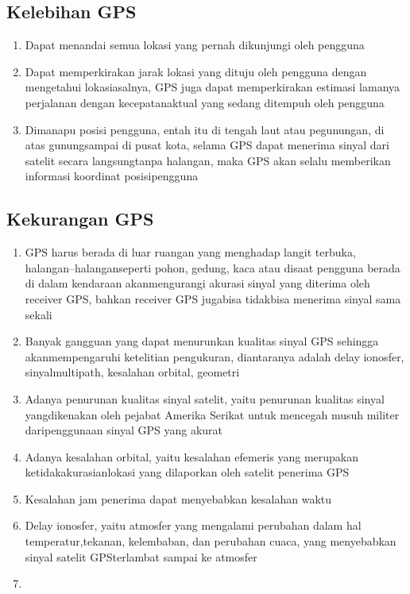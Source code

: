 \subsection{Kelebihan GPS}
\begin{enumerate}
	\item Dapat menandai semua lokasi yang pernah dikunjungi oleh pengguna
	\item Dapat memperkirakan jarak lokasi yang dituju oleh pengguna dengan mengetahui lokasiasalnya, GPS juga dapat memperkirakan estimasi lamanya perjalanan dengan kecepatanaktual yang sedang ditempuh oleh pengguna
	\item Dimanapu posisi pengguna, entah itu di tengah laut atau pegunungan, di atas gunungsampai di pusat kota, selama GPS dapat menerima sinyal dari satelit secara langsungtanpa halangan, maka GPS akan selalu memberikan informasi koordinat posisipengguna
\end{enumerate}

\subsection{Kekurangan GPS}
\begin{enumerate}
	\item GPS harus berada di luar ruangan yang menghadap langit terbuka, halangan–halanganseperti pohon, gedung, kaca atau disaat pengguna berada di dalam kendaraan akanmengurangi akurasi sinyal yang diterima oleh receiver GPS, bahkan receiver GPS jugabisa tidakbisa menerima sinyal sama sekali
	\item Banyak gangguan yang dapat menurunkan kualitas sinyal GPS sehingga akanmempengaruhi ketelitian pengukuran, diantaranya adalah delay ionosfer, sinyalmultipath, kesalahan orbital, geometri
	\item Adanya penurunan kualitas sinyal satelit, yaitu penurunan kualitas sinyal yangdikenakan oleh pejabat Amerika Serikat untuk mencegah musuh militer daripenggunaan sinyal GPS yang akurat
	\item Adanya kesalahan orbital, yaitu kesalahan efemeris yang merupakan ketidakakurasianlokasi yang dilaporkan oleh satelit penerima GPS
	\item Kesalahan jam penerima dapat menyebabkan kesalahan waktu
	\item Delay ionosfer, yaitu atmosfer yang mengalami perubahan dalam hal temperatur,tekanan, kelembaban, dan perubahan cuaca, yang menyebabkan sinyal satelit GPSterlambat sampai ke atmosfer
	\item
\end{enumerate}